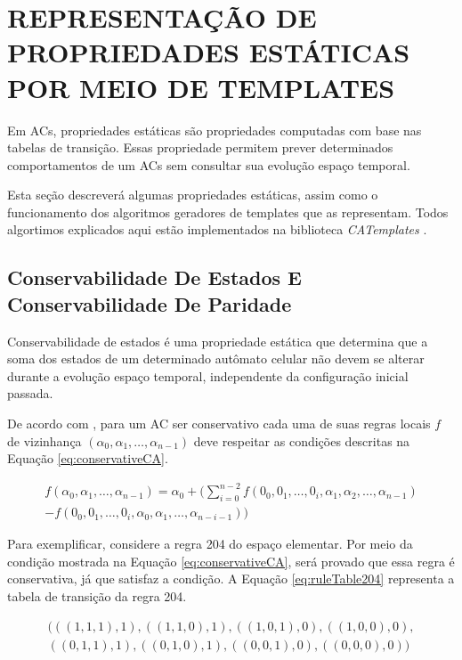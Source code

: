 \documentclass[12pt,a4paper]{article}
\let\stdsection\section
\renewcommand\section{\newpage\stdsection}
\begin{document}
\section{REPRESENTAÇÃO DE PROPRIEDADES ESTÁTICAS POR MEIO DE TEMPLATES}\label{sec:propriedadesEstaticas}

	Em ACs, propriedades estáticas são propriedades computadas com base nas tabelas de transição. Essas propriedade permitem prever determinados comportamentos de um ACs sem consultar sua evolução espaço temporal. 

	Esta seção descreverá algumas propriedades estáticas, assim como o funcionamento dos algoritmos geradores de templates que as representam. Todos algortimos explicados aqui estão implementados na biblioteca \textit{CATemplates} \cite{CATemplates}.

	\subsection{Conservabilidade De Estados E Conservabilidade De Paridade}
	Conservabilidade de estados é uma propriedade estática que determina que a soma dos estados de um determinado autômato celular não devem se alterar durante a evolução espaço temporal, independente da configuração inicial passada.

	De acordo com \cite{boccara2002}, para um AC ser conservativo cada uma de suas regras locais $f$ de vizinhança $(\alpha_0,\alpha_1, \dots, \alpha_{n-1})$ deve respeitar as condições descritas na Equação \ref{eq:conservativeCA}.

	\begin{equation}
	\begin{split}
	f(\alpha_0,\alpha_1, \dots,\alpha_{n-1}) = \alpha_0 + (\sum_{i=0}^{n-2}f(0_0,0_1, \dots,0_i,\alpha_1,\alpha_2, \dots,\alpha_{n-1}) \\- f(0_0,0_1, \dots,0_i,\alpha_0,\alpha_1, \dots,\alpha_{n-i-1}))
	\label{eq:conservativeCA}
	\end{split}
	\end{equation}

	Para exemplificar, considere a regra 204 do espaço elementar. Por meio da condição mostrada na Equação \ref{eq:conservativeCA}, será provado que essa regra é conservativa, já que satisfaz a condição. A Equação \ref{eq:ruleTable204} representa a tabela de transição da regra 204.

	\begin{equation}
	\begin{split}
	(((1,1,1),1),((1,1,0),1),((1,0,1),0),((1,0,0),0),\\((0,1,1),1),((0,1,0),1),((0,0,1),0),((0,0,0),0))
	\label{eq:ruleTable204}
	\end{split}
	\end{equation}
\end{document}
